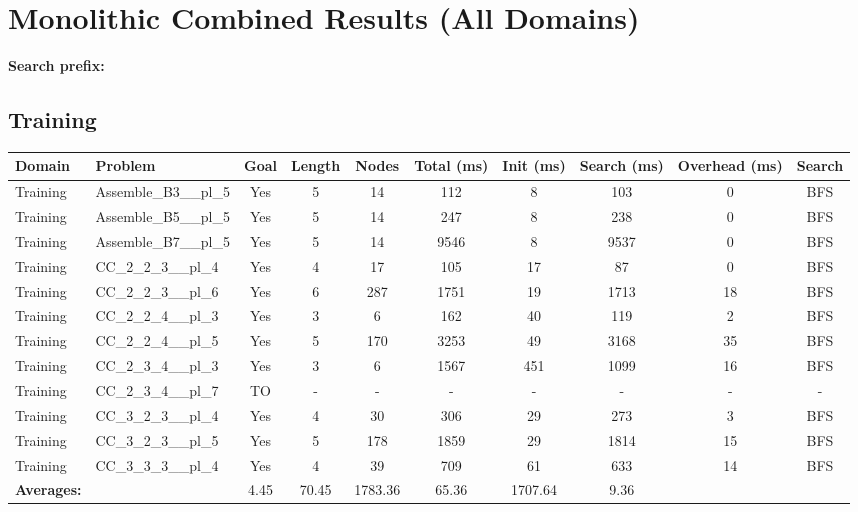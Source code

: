 \documentclass{article}
\begin{document}
\section*{Monolithic Combined Results (All Domains)}
\textbf{Search prefix:} 
\\[0.5cm]
\subsection*{Training}
\begin{tabular}{llcccccccc}
\toprule
Domain & Problem & Goal & Length & Nodes & Total (ms) & Init (ms) & Search (ms) & Overhead (ms) & Search \\
\midrule
Training & Assemble\_B3\_\_pl\_5 & Yes & 5 & 14 & 112 & 8 & 103 & 0 & BFS \\
Training & Assemble\_B5\_\_pl\_5 & Yes & 5 & 14 & 247 & 8 & 238 & 0 & BFS \\
Training & Assemble\_B7\_\_pl\_5 & Yes & 5 & 14 & 9546 & 8 & 9537 & 0 & BFS \\
Training & CC\_2\_2\_3\_\_pl\_4 & Yes & 4 & 17 & 105 & 17 & 87 & 0 & BFS \\
Training & CC\_2\_2\_3\_\_pl\_6 & Yes & 6 & 287 & 1751 & 19 & 1713 & 18 & BFS \\
Training & CC\_2\_2\_4\_\_pl\_3 & Yes & 3 & 6 & 162 & 40 & 119 & 2 & BFS \\
Training & CC\_2\_2\_4\_\_pl\_5 & Yes & 5 & 170 & 3253 & 49 & 3168 & 35 & BFS \\
Training & CC\_2\_3\_4\_\_pl\_3 & Yes & 3 & 6 & 1567 & 451 & 1099 & 16 & BFS \\
Training & CC\_2\_3\_4\_\_pl\_7 & TO & - & - & - & - & - & - & - \\
Training & CC\_3\_2\_3\_\_pl\_4 & Yes & 4 & 30 & 306 & 29 & 273 & 3 & BFS \\
Training & CC\_3\_2\_3\_\_pl\_5 & Yes & 5 & 178 & 1859 & 29 & 1814 & 15 & BFS \\
Training & CC\_3\_3\_3\_\_pl\_4 & Yes & 4 & 39 & 709 & 61 & 633 & 14 & BFS \\
\textbf{Averages:} & & 4.45 & 70.45 & 1783.36 & 65.36 & 1707.64 & 9.36 & \\
\bottomrule
\end{tabular}
\\[0.7cm]
\newpage
\end{document}
